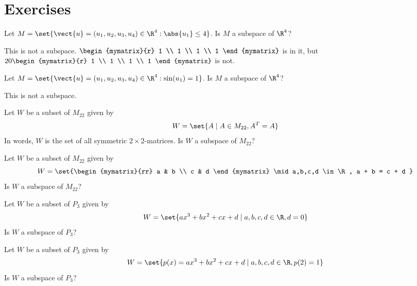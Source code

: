 \section*{Exercises}

\begin{ex} Let $M=\set{\vect{u}=(u_{1},u_{2},u_{3},u_{4}) \in
\R^{4}:\abs{u_{1}} \leq 4}$. Is $M$ a subspace of $\R^4$?
\begin{sol}
This is not a subspace. $\begin{mymatrix}{r}
1 \\
1 \\
1 \\
1
\end{mymatrix} $ is in
it, but $20\begin{mymatrix}{r}
1 \\
1 \\
1 \\
1
\end{mymatrix} $ is not.
\end{sol}
\end{ex}

\begin{ex} Let $M=\set{\vect{u}=(u_{1},u_{2},u_{3},u_{4}) \in
\R^{4}:\sin (u_{1}) =1}$. Is $M$ a subspace of $\R^4$?
\begin{sol}
This is not a subspace.
\end{sol}
\end{ex}

\begin{ex} Let $W$ be a subset of $M_{22}$ given by
\[
W = \set{A \mid A \in M_{22}, A^T = A }
\]
In words, $W$ is the set of all symmetric $2 \times 2$-matrices. Is $W$ a subspace of $M_{22}$?
\end{ex}

\begin{ex} Let $W$ be a subset of $M_{22}$ given by
\[
W = \set{\begin{mymatrix}{rr}
a  & b \\
c & d
\end{mymatrix} \mid a,b,c,d \in \R, a + b = c + d }
\]
Is $W$ a subspace of $M_{22}$?
\end{ex}

\begin{ex} Let $W$ be a subset of $P_3$ given by
\[
W = \set{
ax^3 + bx^2 + cx + d \mid a,b,c,d \in \R, d = 0 }
\]
Is $W$ a subspace of $P_3$?
\end{ex}

\begin{ex} Let $W$ be a subset of $P_3$ given by
\[
W = \set{
p(x) = ax^3 + bx^2 + cx + d \mid a,b,c,d \in \R, p(2) = 1 }
\]
Is $W$ a subspace of $P_3$?
\end{ex}

